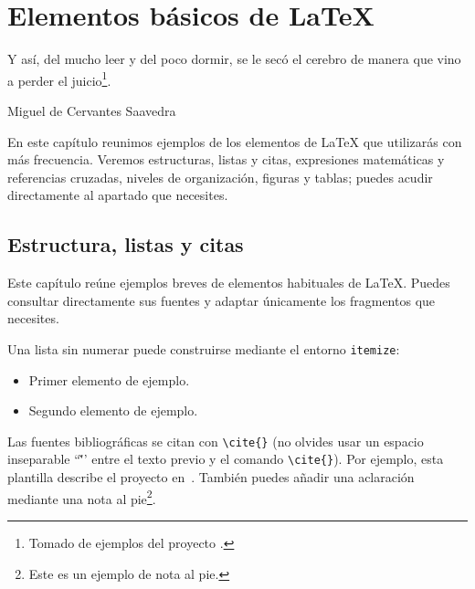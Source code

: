 %

\chapter{Elementos básicos de \LaTeX{}}
\label{cha:elementos-basicos}

\begin{FraseCelebre}
  \begin{Frase}
    Y así, del mucho leer y del poco dormir, se le secó el cerebro de manera que vino a perder el juicio\footnote{Tomado de ejemplos del proyecto \texis{}.}.
  \end{Frase}
  \begin{Fuente}
    Miguel de Cervantes Saavedra
  \end{Fuente}
\end{FraseCelebre}

En este capítulo reunimos ejemplos de los elementos de \LaTeX{} que utilizarás con más frecuencia. Veremos estructuras, listas y citas, expresiones matemáticas y referencias cruzadas, niveles de organización, figuras y tablas; puedes acudir directamente al apartado que necesites.

\section{Estructura, listas y citas}
\label{sec:estructura-listas-citas}

Este capítulo reúne ejemplos breves de elementos habituales de \LaTeX{}. Puedes consultar directamente sus fuentes y adaptar únicamente los fragmentos que necesites.

Una lista sin numerar puede construirse mediante el entorno \texttt{itemize}:

\begin{itemize}
  \item Primer elemento de ejemplo.
  \item Segundo elemento de ejemplo.
\end{itemize}

Las fuentes bibliográficas se citan con \texttt{\textbackslash{}cite\{\}} (no olvides usar un espacio inseparable ``\~'' entre el texto previo y el comando \texttt{\textbackslash{}cite\{\}}). Por ejemplo, esta plantilla describe el proyecto \texis{} en~\cite{texis}. También puedes añadir una aclaración mediante una nota al pie\footnote{Este es un ejemplo de nota al pie.}.

